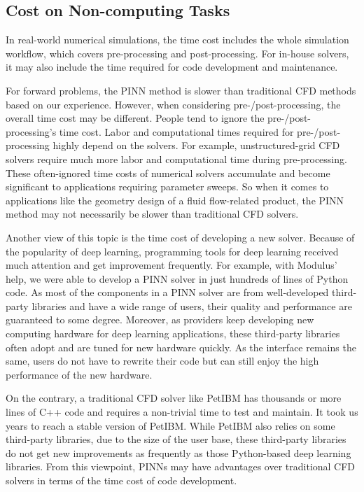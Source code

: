 \subsection*{Cost on Non-computing Tasks}

In real-world numerical simulations, the time cost includes the whole simulation workflow, which covers pre-processing and post-processing.
For in-house solvers, it may also include the time required for code development and maintenance.

For forward problems, the PINN method is slower than traditional CFD methods based on our experience.
However, when considering pre-/post-processing, the overall time cost may be different.
People tend to ignore the pre-/post-processing's time cost.
Labor and computational times required for pre-/post-processing highly depend on the solvers.
For example, unstructured-grid CFD solvers require much more labor and computational time during pre-processing.
These often-ignored time costs of numerical solvers accumulate and become significant to applications requiring parameter sweeps.
So when it comes to applications like the geometry design of a fluid flow-related product, the PINN method may not necessarily be slower than traditional CFD solvers.

Another view of this topic is the time cost of developing a new solver. 
Because of the popularity of deep learning, programming tools for deep learning received much attention and get improvement frequently.
For example, with Modulus' help, we were able to develop a PINN solver in just hundreds of lines of Python code.
As most of the components in a PINN solver are from well-developed third-party libraries and have a wide range of users, their quality and performance are guaranteed to some degree.
Moreover, as providers keep developing new computing hardware for deep learning applications, these third-party libraries often adopt and are tuned for new hardware quickly.
As the interface remains the same, users do not have to rewrite their code but can still enjoy the high performance of the new hardware.

On the contrary, a traditional CFD solver like PetIBM has thousands or more lines of C++ code and requires a non-trivial time to test and maintain.
It took us years to reach a stable version of PetIBM.
While PetIBM also relies on some third-party libraries, due to the size of the user base, these third-party libraries do not get new improvements as frequently as those Python-based deep learning libraries.
From this viewpoint, PINNs may have advantages over traditional CFD solvers in terms of the time cost of code development.

